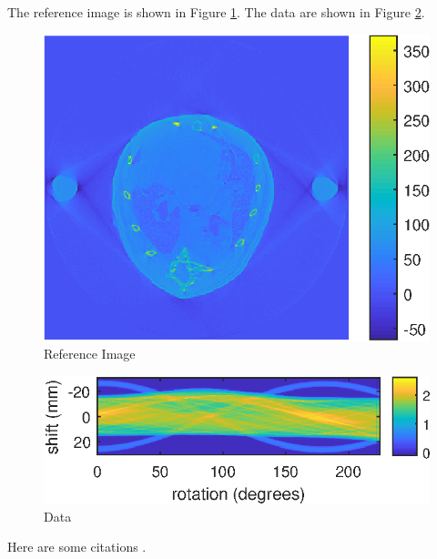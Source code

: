 The reference image is shown in Figure \ref{fig:reference}. The data are shown in Figure \ref{fig:data}.

\begin{figure}%
	\centering
	\includegraphics{plt_demo1_ReferenceImage.eps}	
	
	\caption{Reference Image}\label{fig:reference}
\end{figure}

\begin{figure}%
	\centering
	\includegraphics{plt_demo1_Data.eps}	
	
	\caption{Data}\label{fig:data}
\end{figure}

Here are some citations \cite{moon2000,kak2001}.